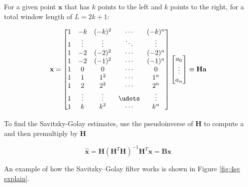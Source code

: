 For a given point $\textbf{x}$ that has $k$ points to the left and $k$ points to the right, for a total window length of $L = 2k + 1$:
\vspace*{0.5cm}

$$\textbf{x}= 
\begin{bmatrix}
    1 & -k & (-k)^2 & \cdots & (-k)^n\\ 
    1 & \vdots &\vdots & \ddots & \vdots\\  
    1 & -2 & (-2)^2 & \cdots & (-2)^n\\  
    1 & -2 & (-1)^2 & \cdots & (-1)^n\\  
    1 & 0 & 0 & \cdots & 0\\   
    1 & 1 & 1^2 & \cdots & 1^n\\   
    1 & 2 & 2^2 & \cdots & 2^n\\    
    1 & \vdots &\vdots & \udots & \vdots\\   
    1 & k & k^2 & \cdots & k^n\\   
  \end{bmatrix}
  \begin{bmatrix}
    a_0\\ 
    \vdots \\  
    a_n 
  \end{bmatrix}
\equiv
  \textbf{Ha}
  $$
  \vspace*{0.5cm}


  To find the Savitzky-Golay estimates, use the pseudoinverse of $\textbf{H}$ to compute a and then premultiply by $\textbf{H}$
  \vspace*{0.5cm}

$$
\hat{\textbf{x}} = \textbf{H}(\textbf{H}^\textit{T}\textbf{H})^{-1}\textbf{H}^\textit{T}\textbf{x} = \textbf{Bx} 
$$ 

\vspace*{0.5cm}

An example of how the Savitzky–Golay filter works is shown in Figure \ref{fig:4sg explain}.

